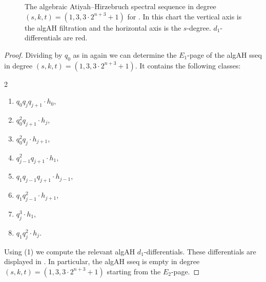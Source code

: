 \begin{figure}[h]
\begin{center}
{}
\end{center}
\caption{The algebraic Atiyah--Hirzebruch spectral sequence in degree $(s,k,t) = (1,3, 3\cdot 2^{n+3}+1)$ for . In this chart the vertical axis is the algAH filtration and the horizontal axis is the $s$-degree. $d_1$-differentials are red.}
\label{fig:algA 1-3}
\end{figure}


\begin{proof}
  Dividing by $q_0$ as in  again we can determine
  the $E_1$-page of the algAH sseq in degree $(s,k,t) = (1,3,3 \cdot 2^{n+3} + 1)$.
  It contains the following classes:
  \begin{multicols}{2}
    \begin{enumerate}
    \item $q_0q_{j}q_{j+1} \cdot h_0$,
    \item $q_0^2q_{j+1} \cdot h_{j}$,
    \item $q_0^2q_{j} \cdot h_{j+1}$,
    \item $q_{j-1}^2q_{j+1} \cdot h_1$,
    \item $q_1q_{j-1}q_{j+1} \cdot h_{j-1}$,
    \item $q_1q_{j-1}^2 \cdot h_{j+1}$,
    \item $q_{j}^3 \cdot h_{1}$,
    \item $q_1q_{j}^2 \cdot h_{j}$.
    \end{enumerate}
  \end{multicols}
  Using (1) we compute the relevant algAH $d_1$-differentials.
  These differentials are displayed in .
  In particular, the algAH sseq is empty in degree $(s,k,t) = (1,3,3 \cdot 2^{n+3} + 1)$ starting from the $E_2$-page.  
\end{proof}

